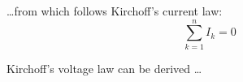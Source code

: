 \documentclass[a4paper, 11pt]{article}
\begin{document}
\ldots from which follows Kirchoff's current law:
\begin{equation}
  \sum_{k=1}^{n} I_k = 0 \;
\end{equation}

Kirchoff's voltage law can be derived \ldots
\end{document}
